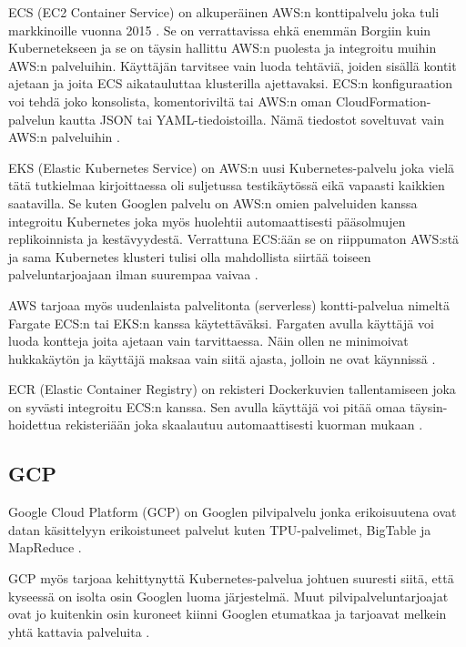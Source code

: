 \documentclass[finnish]{tktltiki2}
\theoremstyle{definition}
\theoremstyle{remark}
\begin{document}
ECS (EC2 Container Service) on alkuperäinen AWS:n konttipalvelu joka tuli markkinoille vuonna 2015 \cite{aws-introducing-ecs}. Se on verrattavissa ehkä enemmän Borgiin kuin Kubernetekseen ja se on täysin hallittu AWS:n puolesta ja integroitu muihin AWS:n palveluihin. Käyttäjän tarvitsee vain luoda tehtäviä, joiden sisällä kontit ajetaan ja joita ECS aikatauluttaa klusterilla ajettavaksi. ECS:n konfiguraation voi tehdä joko konsolista, komentoriviltä tai AWS:n oman CloudFormation-palvelun kautta JSON tai YAML-tiedoistoilla. Nämä tiedostot soveltuvat vain AWS:n palveluihin \cite{aws-docs-ecs}.

EKS (Elastic Kubernetes Service) on AWS:n uusi Kubernetes-palvelu joka vielä tätä tutkielmaa kirjoittaessa oli suljetussa testikäytössä eikä vapaasti kaikkien saatavilla. Se kuten Googlen palvelu on AWS:n omien palveluiden kanssa integroitu Kubernetes joka myös huolehtii automaattisesti pääsolmujen replikoinnista ja kestävyydestä. Verrattuna ECS:ään se on riippumaton AWS:stä ja sama Kubernetes klusteri tulisi olla mahdollista siirtää toiseen palveluntarjoajaan ilman suurempaa vaivaa \cite{aws-docs-eks}.

AWS tarjoaa myös uudenlaista palvelitonta (serverless) kontti-palvelua nimeltä Fargate ECS:n tai EKS:n kanssa käytettäväksi. Fargaten avulla käyttäjä voi luoda kontteja joita ajetaan vain tarvittaessa. Näin ollen ne minimoivat hukkakäytön ja käyttäjä maksaa vain siitä ajasta, jolloin ne ovat käynnissä \cite{aws-docs-fargate}.

ECR (Elastic Container Registry) on rekisteri Dockerkuvien tallentamiseen joka on syvästi integroitu ECS:n kanssa. Sen avulla käyttäjä voi pitää omaa täysin-hoidettua rekisteriään joka skaalautuu automaattisesti kuorman mukaan \cite{aws-docs-ecr}.

\subsection{GCP}
\label{sb:gcp}

Google Cloud Platform (GCP) on Googlen pilvipalvelu jonka erikoisuutena ovat datan käsittelyyn erikoistuneet palvelut kuten TPU-palvelimet, BigTable ja MapReduce \cite{gcp-advantages}.

GCP myös tarjoaa kehittynyttä Kubernetes-palvelua johtuen suuresti siitä, että kyseessä on isolta osin Googlen luoma järjestelmä. Muut pilvipalveluntarjoajat ovat jo kuitenkin osin kuroneet kiinni Googlen etumatkaa ja tarjoavat melkein yhtä kattavia palveluita \cite{kubernetes-competition}.
\end{document}
